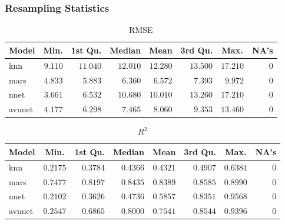 \documentclass[letterpaper,12pt,titlepage,oneside,final]{report}
\begin{document}
            \subsubsection {Resampling Statistics}
                \begin{table}[!hp]
                    \begin{center}
                    \begin{tabular}{lrrrrrrr}
                    \hline\hline
                    \multicolumn{1}{l}{Model}&\multicolumn{1}{c}{Min.}&\multicolumn{1}{c}{1st Qu.}&\multicolumn{1}{c}{Median}&\multicolumn{1}{c}{Mean}&\multicolumn{1}{c}{3rd Qu.}&\multicolumn{1}{c}{Max.}&\multicolumn{1}{c}{NA's}\tabularnewline
                    \hline
                    knn&$9.110$&$11.040$&$12.010$&$12.280$&$13.500$&$17.210$&$0$\tabularnewline
                    mars&$4.833$&$ 5.883$&$ 6.360$&$ 6.572$&$ 7.393$&$ 9.972$&$0$\tabularnewline
                    nnet&$3.661$&$ 6.532$&$10.680$&$10.010$&$13.260$&$17.210$&$0$\tabularnewline
                    avnnet&$4.177$&$ 6.298$&$ 7.465$&$ 8.060$&$ 9.353$&$13.460$&$0$\tabularnewline
                    \hline
                    \end{tabular}\end{center}
                    \caption{RMSE\label{RMSE}} 
                    \end{table}
                    \begin{table}[!hp]
                    \begin{center}
                    \begin{tabular}{lrrrrrrr}
                    \hline\hline
                    \multicolumn{1}{l}{Model}&\multicolumn{1}{c}{Min.}&\multicolumn{1}{c}{1st Qu.}&\multicolumn{1}{c}{Median}&\multicolumn{1}{c}{Mean}&\multicolumn{1}{c}{3rd Qu.}&\multicolumn{1}{c}{Max.}&\multicolumn{1}{c}{NA's}\tabularnewline
                    \hline
                    knn&$0.2175$&$0.3784$&$0.4366$&$0.4321$&$0.4907$&$0.6384$&$0$\tabularnewline
                    mars&$0.7477$&$0.8197$&$0.8435$&$0.8389$&$0.8585$&$0.8990$&$0$\tabularnewline
                    nnet&$0.2102$&$0.3626$&$0.4736$&$0.5857$&$0.8351$&$0.9568$&$0$\tabularnewline
                    avnnet&$0.2547$&$0.6865$&$0.8000$&$0.7541$&$0.8544$&$0.9396$&$0$\tabularnewline
                    \hline
                    \end{tabular}
                    \caption{$R^2$\label{Rsquared}} 
                    \end{center}
                    \end{table}
                \clearpage
\end{document}
